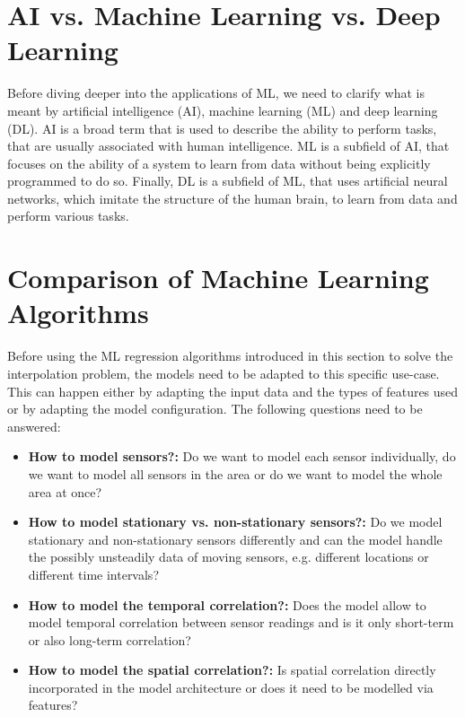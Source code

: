 \section{AI vs. Machine Learning vs. Deep Learning}

Before diving deeper into the applications of ML, we need to clarify what is meant by artificial intelligence (AI), machine learning (ML) and deep learning (DL). AI is a broad term that is used to describe the ability to perform tasks, that are usually associated with human intelligence. ML is a subfield of AI, that focuses on the ability of a system to learn from data without being explicitly programmed to do so. Finally, DL is a subfield of ML, that uses artificial neural networks, which imitate the structure of the human brain, to learn from data and perform various tasks.\\

\section{Comparison of Machine Learning Algorithms}
\label{sec:taxonomy}

Before using the ML regression algorithms introduced in this section to solve the interpolation problem, the models need to be adapted to this specific use-case. This can happen either by adapting the input data and the types of features used or by adapting the model configuration. The following questions need to be answered:

\begin{itemize}
    \item \textbf{How to model sensors?:} Do we want to model each sensor individually, do we want to model all sensors in the area or do we want to model the whole area at once?
    \item \textbf{How to model stationary vs. non-stationary sensors?:} Do we model stationary and non-stationary sensors differently and can the model handle the possibly unsteadily data of moving sensors, e.g. different locations or different time intervals?
    \item \textbf{How to model the temporal correlation?:} Does the model allow to model temporal correlation between sensor readings and is it only short-term or also long-term correlation?
    \item \textbf{How to model the spatial correlation?:} Is spatial correlation directly incorporated in the model architecture or does it need to be modelled via features?
\end{itemize}

